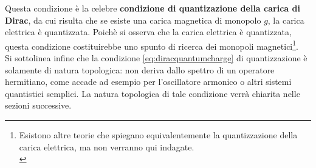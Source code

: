 Questa condizione è la celebre \textbf{condizione di quantizazione della carica
di Dirac}, da cui risulta che se esiste una carica magnetica di monopolo $g$,
la carica elettrica è quantizzata. Poichè si osserva che la carica elettrica è
quantizzata, questa condizione costituirebbe uno spunto di ricerca dei monopoli
magnetici\footnote{
   Esistono altre teorie che spiegano equivalentemente la quantizzazione della carica
   elettrica, ma non verranno qui indagate.\\
}.\\

Si sottolinea infine che la condizione \ref{eq:diracquantumcharge} di quantizzazione
è solamente di natura topologica: non deriva dallo spettro di un operatore hermitiano,
come accade ad esempio per l'oscillatore armonico o altri sistemi quantistici semplici.
La natura topologica di tale condizione verrà chiarita nelle sezioni successive.

